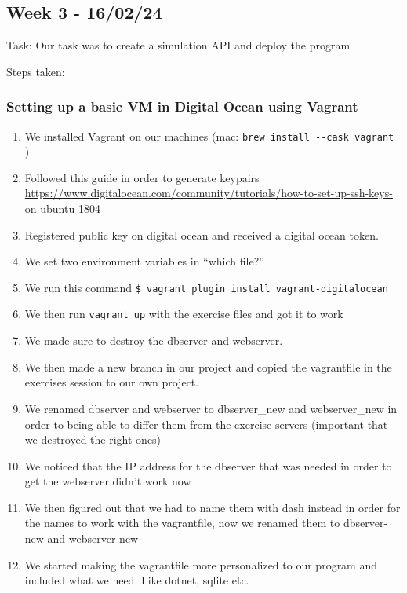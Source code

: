 \subsection{Week 3 - 16/02/24}
\label{log:week3}

Task: Our task was to create a simulation API and deploy the program

Steps taken:

\subsubsection{Setting up a basic VM in Digital Ocean using Vagrant}
\label{log:setting-up-a-basic-vm-in-digital-ocean-using-vagrant}

\begin{enumerate}
    \item We installed Vagrant on our machines (mac: \texttt{brew\ install\ -\/-cask\ vagrant} )
    \item Followed this guide in order to generate keypairs \url{https://www.digitalocean.com/community/tutorials/how-to-set-up-ssh-keys-on-ubuntu-1804}
    \item Registered public key on digital ocean and received a digital ocean token.
    \item We set two environment variables in ``which file?''
    \item We run this command \texttt{\$\ vagrant\ plugin\ install\ vagrant-digitalocean}
    \item We then run \texttt{vagrant\ up} with the exercise files and got it to work
    \item We made sure to destroy the dbserver and webserver.
    \item We then made a new branch in our project and copied the vagrantfile in the exercises session to our own project.
    \item We renamed dbserver and webserver to dbserver\_new and webserver\_new in order to being able to differ them from the exercise servers (important that we destroyed the right ones)
    \item We noticed that the IP address for the dbserver that was needed in order to get the webserver didn't work now
    \item We then figured out that we had to name them with dash instead in order for the names to work with the vagrantfile, now we renamed them to dbserver-new and webserver-new
    \item We started making the vagrantfile more personalized to our program and included what we need. Like dotnet, sqlite etc.
\end{enumerate}

